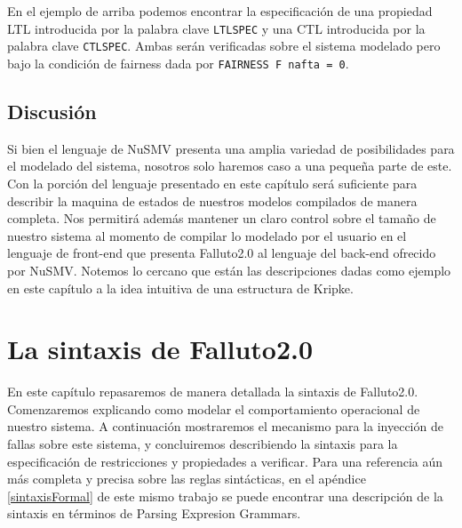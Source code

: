 \documentclass[titlepage, 12pt]{book}
\begin{document}
En el ejemplo de arriba podemos encontrar la especificaci\'on de una propiedad LTL introducida por la palabra clave \texttt{LTLSPEC} y una CTL introducida por la palabra clave \texttt{CTLSPEC}. Ambas ser\'an verificadas sobre el sistema modelado pero bajo la condici\'on de fairness dada por \texttt{FAIRNESS F nafta = 0}.

\section*{Discusi\'on}

Si bien el lenguaje de NuSMV presenta una amplia variedad de posibilidades para el modelado del sistema, nosotros solo haremos caso a una peque\~na parte de este. Con la porci\'on del lenguaje presentado en este cap\'itulo ser\'a suficiente para describir la maquina de estados de nuestros modelos compilados de manera completa. Nos permitir\'a adem\'as mantener un claro control sobre el tama\~no de nuestro sistema al momento de compilar lo modelado por el usuario en el lenguaje de front-end que presenta Falluto2.0 al lenguaje del back-end ofrecido por NuSMV. Notemos lo cercano que est\'an las descripciones dadas como ejemplo en este cap\'itulo a la idea intuitiva de una estructura de Kripke.



\chapter{La sintaxis de Falluto2.0}
\label{sintaxisDeFalluto}

En este cap\'itulo repasaremos de manera detallada la sintaxis de Falluto2.0. Comenzaremos explicando como modelar el comportamiento operacional de nuestro sistema. A continuaci\'on mostraremos el mecanismo para la inyecci\'on de fallas sobre este sistema, y concluiremos describiendo la sintaxis para la especificaci\'on de restricciones y propiedades a verificar. Para una referencia a\'un m\'as completa y precisa sobre las reglas sint\'acticas, en el ap\'endice \ref{sintaxisFormal} de este mismo trabajo se puede encontrar una descripci\'on de la sintaxis en t\'erminos de Parsing Expresion Grammars.
\end{document}
